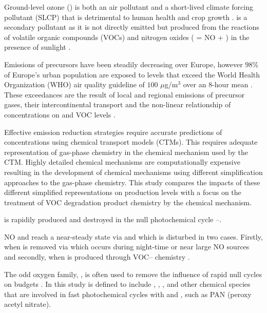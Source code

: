 Ground-level ozone () is both an air pollutant and a short-lived climate forcing pollutant (SLCP) that is detrimental to human health and crop growth \citep{AQEU:2013}. 
 is a secondary pollutant as it is not directly emitted but produced from the reactions of volatile organic compounds (VOCs) and nitrogen oxides ( = NO + ) in the presence of sunlight \citep{Atkinson:2000}.

Emissions of  precursors have been steadily decreasing over Europe, however $98$\% of Europe's urban population are exposed to levels that exceed the World Health Organization (WHO) air quality guideline of $100$ $\mu$g/m$^3$ over an $8$-hour mean \citep{WHO:2006}. 
These exceedances are the result of local and regional emissions of  precursor gases, their intercontinental transport and the non-linear relationship of  concentrations on  and VOC levels \citep{AQEU:2013}.

Effective emission reduction strategies require accurate predictions of  concentrations using chemical transport models (CTMs). 
This requires adequate representation of gas-phase chemistry in the chemical mechanism used by the CTM. 
Highly detailed chemical mechanisms are computationally expensive resulting in the development of chemical mechanisms using different simplification approaches to the gas-phase chemistry.
This study compares the impacts of these different simplified representations on  production levels with a focus on the treatment of VOC degradation product chemistry by the chemical mechanism.

 is rapidily produced and destroyed in the null photochemical cycle --. 
\begin{reactionlist}
\end{reactionlist}
NO and  reach a near-steady state via  and  which is disturbed in two cases. 
Firstly, when  is removed via  which occurs during night-time or near large NO sources and secondly, when  is produced through VOC-- chemistry \citep{Sillman:1999}.

The odd oxygen family, , is often used to remove the influence of rapid null cycles on  budgets \citep{Seinfeld:2006}. 
In this study  is defined to include , , ,  and other chemical species that are involved in fast photochemical cycles with  and , such as PAN (peroxy acetyl nitrate).

